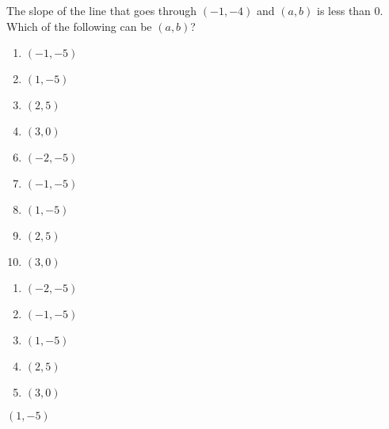 


 The slope of the line that goes through $(-1,-4)$ and $(a,b)$ is less than 0.  Which of the following can be $(a,b)$?


\ifsat
	\begin{enumerate}[label=\Alph*)]
		\item  $(-1,-5)$ 
		\item  $(1,-5)$ %
		\item  $(2,5)$ 
		\item  $(3,0)$ 
	\end{enumerate}
\else
\fi

\ifacteven
	\begin{enumerate}[label=\textbf{\Alph*.},itemsep=\fill,align=left]
		\setcounter{enumii}{5}
		\item   $(-2,-5)$
		\item  $(-1,-5)$ 
		\item  $(1,-5)$ %
		\addtocounter{enumii}{1}
		\item  $(2,5)$ 
		\item  $(3,0)$ 
	\end{enumerate}
\else
\fi

\ifactodd
	\begin{enumerate}[label=\textbf{\Alph*.},itemsep=\fill,align=left]
		\item   $(-2,-5)$
		\item  $(-1,-5)$ 
		\item  $(1,-5)$ %
		\item  $(2,5)$ 
		\item  $(3,0)$ 
	\end{enumerate}
\else
\fi

\ifgridin
  $(1,-5)$ %
		
\else
\fi

